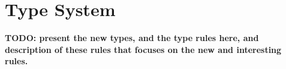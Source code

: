 \section{Type System}
\label{sec:types}

{\bf TODO: present the new types, and the type rules here, and description of 
these rules that focuses on the new and interesting rules.}

